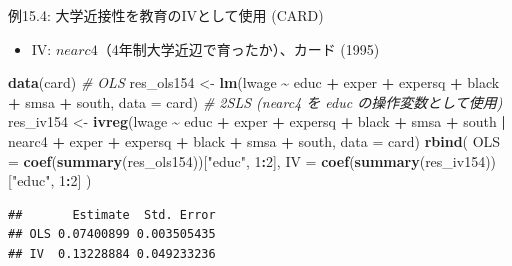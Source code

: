 \documentclass[
  ignorenonframetext,
]{beamer}
\newenvironment{Shaded}{\begin{snugshade}}{\end{snugshade}}
\newcommand{\AttributeTok}[1]{\textcolor[rgb]{0.13,0.29,0.53}{#1}}
\newcommand{\CommentTok}[1]{\textcolor[rgb]{0.56,0.35,0.01}{\textit{#1}}}
\newcommand{\DecValTok}[1]{\textcolor[rgb]{0.00,0.00,0.81}{#1}}
\newcommand{\FunctionTok}[1]{\textcolor[rgb]{0.13,0.29,0.53}{\textbf{#1}}}
\newcommand{\NormalTok}[1]{#1}
\newcommand{\OtherTok}[1]{\textcolor[rgb]{0.56,0.35,0.01}{#1}}
\newcommand{\SpecialCharTok}[1]{\textcolor[rgb]{0.81,0.36,0.00}{\textbf{#1}}}
\newcommand{\StringTok}[1]{\textcolor[rgb]{0.31,0.60,0.02}{#1}}
\providecommand{\tightlist}{%
  \setlength{\itemsep}{0pt}\setlength{\parskip}{0pt}}
\begin{document}
\begin{frame}[fragile]{例15.4: 大学近接性を教育のIVとして使用 (CARD)}
\label{ux4f8b15.4-ux5927ux5b66ux8fd1ux63a5ux6027ux3092ux6559ux80b2ux306eivux3068ux3057ux3066ux4f7fux7528-card}
\begin{itemize}
\tightlist
\item
  IV: \(nearc4\)（4年制大学近辺で育ったか）、カード (1995)
\end{itemize}

\scriptsize

\begin{Shaded}
\begin{Highlighting}[]
\FunctionTok{data}\NormalTok{(card)}
\CommentTok{\# OLS}
\NormalTok{res\_ols154 }\OtherTok{\textless{}{-}} \FunctionTok{lm}\NormalTok{(lwage }\SpecialCharTok{\textasciitilde{}}\NormalTok{ educ }\SpecialCharTok{+}\NormalTok{ exper }\SpecialCharTok{+}\NormalTok{ expersq }\SpecialCharTok{+}\NormalTok{ black }\SpecialCharTok{+}\NormalTok{ smsa }\SpecialCharTok{+}\NormalTok{ south,}
                 \AttributeTok{data =}\NormalTok{ card)}
\CommentTok{\# 2SLS (nearc4 を educ の操作変数として使用)}
\NormalTok{res\_iv154 }\OtherTok{\textless{}{-}} \FunctionTok{ivreg}\NormalTok{(lwage }\SpecialCharTok{\textasciitilde{}}\NormalTok{ educ }\SpecialCharTok{+}\NormalTok{ exper }\SpecialCharTok{+}\NormalTok{ expersq }\SpecialCharTok{+}\NormalTok{ black }\SpecialCharTok{+}\NormalTok{ smsa }\SpecialCharTok{+}\NormalTok{ south }\SpecialCharTok{|}
\NormalTok{                     nearc4 }\SpecialCharTok{+}\NormalTok{ exper }\SpecialCharTok{+}\NormalTok{ expersq }\SpecialCharTok{+}\NormalTok{ black }\SpecialCharTok{+}\NormalTok{ smsa }\SpecialCharTok{+}\NormalTok{ south,}
                   \AttributeTok{data =}\NormalTok{ card)}
\FunctionTok{rbind}\NormalTok{(}
  \AttributeTok{OLS =} \FunctionTok{coef}\NormalTok{(}\FunctionTok{summary}\NormalTok{(res\_ols154))[}\StringTok{"educ"}\NormalTok{, }\DecValTok{1}\SpecialCharTok{:}\DecValTok{2}\NormalTok{],}
  \AttributeTok{IV  =} \FunctionTok{coef}\NormalTok{(}\FunctionTok{summary}\NormalTok{(res\_iv154))[}\StringTok{"educ"}\NormalTok{, }\DecValTok{1}\SpecialCharTok{:}\DecValTok{2}\NormalTok{]}
\NormalTok{)}
\end{Highlighting}
\end{Shaded}

\begin{verbatim}
##       Estimate  Std. Error
## OLS 0.07400899 0.003505435
## IV  0.13228884 0.049233236
\end{verbatim}

\normalsize
\end{frame}
\end{document}
